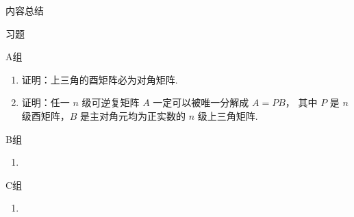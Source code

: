 \vspace{2ex}
\centerline{\heiti \Large 内容总结}

\vspace{2ex}

\centerline{\heiti \Large 习题}
\vspace{2ex}
{\kaishu }
\begin{flushright}
    \kaishu

\end{flushright}
\centerline{\heiti A组}
\begin{enumerate}
    \item 证明：上三角的酉矩阵必为对角矩阵. 
    
    \item 证明：任一 $ n $ 级可逆复矩阵 $ A $ 一定可以被唯一分解成 $ A = PB $，
    其中 $ P $ 是 $ n $ 级酉矩阵，$ B $ 是主对角元均为正实数的 $ n $ 级上三角矩阵. 
\end{enumerate}
\centerline{\heiti B组}
\begin{enumerate}
    \item
\end{enumerate}
\centerline{\heiti C组}
\begin{enumerate}
    \item
\end{enumerate}

